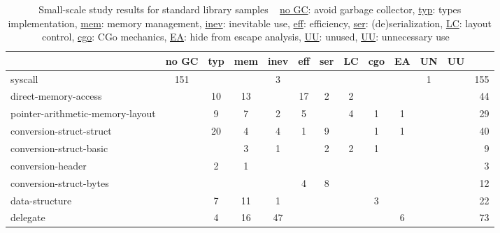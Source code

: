 \begin{table}[h]
    \caption[Small-scale study results for standard library samples]%
        {Small-scale study results for standard library samples \newline \tiny ~ \newline \small
            \underline{no GC}: avoid garbage collector, \underline{typ}: types implementation,
            \underline{mem}: memory management, \underline{inev}: inevitable use, \underline{eff}: efficiency,
            \underline{ser}: (de)serialization, \underline{LC}: layout control, \underline{cgo}: CGo mechanics,
            \underline{EA}: hide from escape analysis, \underline{UU}: unused, \underline{UU}: unnecessary use \newline \tiny ~}
    \label{tbl:survey-small-results-std}
    \begin{tabularx}{\textwidth}{Xccccccccccc|r}
        \toprule
                                          & no GC & typ & mem & inev & eff & ser & LC & cgo & EA & UN & UU &   {} \\
        \midrule
                                  syscall &   151 &     &     &    3 &     &     &    &     &    &  1 &    &  155 \\
        \rowcolor{verylightgray}
                     direct-memory-access &       &  10 &  13 &      &  17 &   2 &  2 &     &    &    &    &   44 \\
         pointer-arithmetic-memory-layout &       &   9 &   7 &    2 &   5 &     &  4 &   1 &  1 &    &    &   29 \\
        \rowcolor{verylightgray}
                 conversion-struct-struct &       &  20 &   4 &    4 &   1 &   9 &    &   1 &  1 &    &    &   40 \\
                  conversion-struct-basic &       &     &   3 &    1 &     &   2 &  2 &   1 &    &    &    &    9 \\
        \rowcolor{verylightgray}
                        conversion-header &       &   2 &   1 &      &     &     &    &     &    &    &    &    3 \\
                  conversion-struct-bytes &       &     &     &      &   4 &   8 &    &     &    &    &    &   12 \\
        \rowcolor{verylightgray}
                           data-structure &       &   7 &  11 &    1 &     &     &    &   3 &    &    &    &   22 \\
                                 delegate &       &   4 &  16 &   47 &     &     &    &     &  6 &    &    &   73 \\

\end{tabularx}
\end{table}
